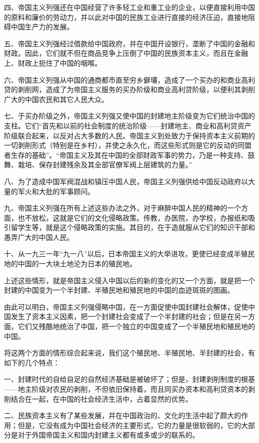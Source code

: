 四、帝国主义列强还在中国经营了许多轻工业和重工业的企业，以便直接利用中国的原料和廉价的劳动力，并以此对中国的民族工业进行直接的经济压迫，直接地阻碍中国生产力的发展。

五、帝国主义列强经过借款给中国政府，并在中国开设银行，垄断了中国的金融和财政。因此，它们就不但在商品竞争上压倒了中国的民族资本主义，而且在金融上、财政上扼住了中国的咽喉。

六、帝国主义列强从中国的通商都市直至穷乡僻壤，造成了一个买办的和商业高利贷的剥削网，造成了为帝国主义服务的买办阶级和商业高利贷阶级，以便利其剥削广大的中国农民和其它人民大众。

七、于买办阶级之外，帝国主义列强又使中国的封建地主阶级变为它们统治中国的支柱。它们“首先和以前的社会制度的统治阶级——封建地主、商业和高利贷资产阶级联合起来，以反对占大多数的人民。帝国主义到处致力于保持资本主义前期的一切剥削形式（特别是在乡村），并使之永久化，而这些形式则是它的反动的同盟者生存的基础”。“帝国主义及其在中国的全部财政军事的势力，乃是一种支持、鼓舞、栽培、保存封建残余及其全部官僚军阀上层建筑的力量。”

八、为了造成中国军阀混战和镇压中国人民，帝国主义列强供给中国反动政府以大量的军火和大批的军事顾问。

九、帝国主义列强在所有上述这些办法之外，对于麻醉中国人民的精神的一个方面，也不放松，这就是它们的文化侵略政策。传教，办医院，办学校，办报纸和吸引留学生等，就是这个侵略政策的实施。其目的，在于造就服从它们的知识干部和愚弄广大的中国人民。

十、从一九三一年“九一八”以后，日本帝国主义的大举进攻，更使已经变成半殖民地的中国的一大块土地沦为日本的殖民地。

上述这些情形，就是帝国主义侵入中国以后的新的变化的又一个方面，就是把一个封建的中国变为一个半封建、半殖民地和殖民地的中国的血迹斑斑的图画。

由此可以明白，帝国主义列强侵略中国，在一方面促使中国封建社会解体，促使中国发生了资本主义因素，把一个封建社会变成了一个半封建的社会；但是在另一方面，它们又残酷地统治了中国，把一个独立的中国变成了一个半殖民地和殖民地的中国。

将这两个方面的情形综合起来说，我们这个殖民地、半殖民地、半封建的社会，有如下的几个特点：

一、封建时代的自给自足的自然经济基础是被破坏了；但是，封建剥削制度的根基——地主阶级对农民的剥削，不但依旧保持着，而且同买办资本和高利贷资本的剥削结合在一起，在中国的社会经济生活中，占着显然的优势。

二、民族资本主义有了某些发展，并在中国政治的、文化的生活中起了颇大的作用；但是，它没有成为中国社会经济的主要形式，它的力量是很软弱的，它的大部分是对于外国帝国主义和国内封建主义都有或多或少的联系的。

